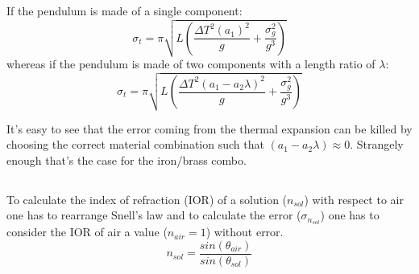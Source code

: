 \documentclass[twocolumn]{article}
\begin{document}
	If the pendulum is made of a single component:
	\begin{equation}
	\sigma_t  = \pi \sqrt{L \left(\frac{\Delta T^{2} \left(a_{1} \right)^{2}}{g} + \frac{\sigma_{g}^{2}}{g^{3}}\right)}
	\end{equation}
	whereas if the pendulum is made of two components with a length ratio of $\lambda$:
	\begin{equation}
	\sigma_t  = \pi \sqrt{L \left(\frac{ \Delta  T^{2} \left(a_{1} - a_{2} \lambda \right)^{2}}{g} + \frac{\sigma_{g}^{2}}{g^{3}}\right)}
	\end{equation}

	It's easy to see that the error coming from the thermal expansion can be killed by choosing the correct material combination such that $ \left(a_{1} - a_{2} \lambda\right) \approx 0 $. Strangely enough that's the case for the iron/brass combo.
\subsection{} %
\label{sub:snell}
	To calculate the index of refraction (IOR) of a solution ($n_{sol}$) with respect to air one has to rearrange Snell's law and to calculate the error ($\sigma_{n_{sol}}$) one has to consider the IOR of air a value ($n_{air} =1 $) without error.
	\begin{equation}
	n_{sol} = \frac{ sin(\theta_{air})}{sin(\theta_{sol})} 
	\end{equation}
\end{document}
